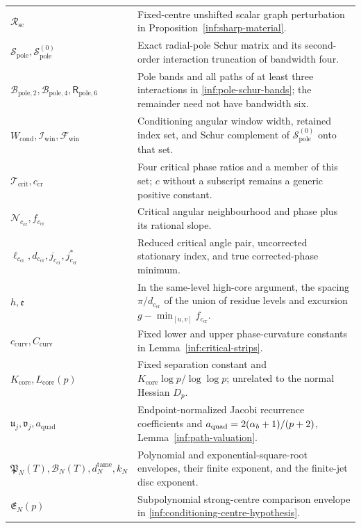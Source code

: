 \begin{longtable}{@{}>{\raggedright\arraybackslash}p{}>{\raggedright\arraybackslash}p{}@{}}
$\mathcal R_{\mathrm{sc}}$ & Fixed-centre unshifted scalar graph perturbation in Proposition~\ref{inf:sharp-material}.\\
$\mathcal S_{\mathrm{pole}},\mathcal S_{\mathrm{pole}}^{(0)}$ & Exact radial-pole Schur matrix and its second-order interaction truncation of bandwidth four.\\
$\mathcal B_{\mathrm{pole},2},\mathcal B_{\mathrm{pole},4},\mathsf R_{\mathrm{pole},6}$ & Pole bands and all paths of at least three interactions in \eqref{inf:pole-schur-bands}; the remainder need not have bandwidth six.\\
$W_{\mathrm{cond}},\mathcal I_{\mathrm{win}},\mathcal F_{\mathrm{win}}$ & Conditioning angular window width, retained index set, and Schur complement of $\mathcal S_{\mathrm{pole}}^{(0)}$ onto that set.\\
$\mathcal T_{\mathrm{crit}},c_{\mathrm{cr}}$ & Four critical phase ratios and a member of this set; $c$ without a subscript remains a generic positive constant.\\
$\mathcal N_{c_{\mathrm{cr}}},f_{c_{\mathrm{cr}}}$ & Critical angular neighbourhood and phase plus its rational slope.\\
$\ell_{c_{\mathrm{cr}}},d_{c_{\mathrm{cr}}},j_{c_{\mathrm{cr}}},j_{c_{\mathrm{cr}}}^*$ & Reduced critical angle pair, uncorrected stationary index, and true corrected-phase minimum.\\
$h,\mathfrak e$ & In the same-level high-core argument, the spacing $\pi/d_{c_{\mathrm{cr}}}$ of the union of residue levels and excursion $g-\min_{[u,v]}f_{c_{\mathrm{cr}}}$.\\
$c_{\mathrm{curv}},C_{\mathrm{curv}}$ & Fixed lower and upper phase-curvature constants in Lemma~\ref{inf:critical-strips}.\\
$K_{\mathrm{core}},L_{\mathrm{core}}(p)$ & Fixed separation constant and $K_{\mathrm{core}}\log p/\log\log p$; unrelated to the normal Hessian $D_p$.\\
$\mathfrak u_j,\mathfrak v_j,a_{\mathrm{quad}}$ & Endpoint-normalized Jacobi recurrence coefficients and $a_{\mathrm{quad}}=2(\alpha_b+1)/(p+2)$, Lemma~\ref{inf:path-valuation}.\\
$\mathfrak P_N(T),\mathcal B_N(T),d_N^{\mathrm{tame}},k_N$ & Polynomial and exponential-square-root envelopes, their finite exponent, and the finite-jet disc exponent.\\
$\mathfrak E_N(p)$ & Subpolynomial strong-centre comparison envelope in \eqref{inf:conditioning-centre-hypothesis}.\\

\end{longtable}
